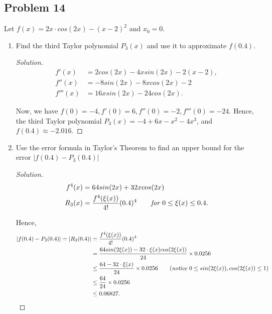 \documentclass{article}
\begin{document}
\subsection*{Problem 14}
Let $f(x) = 2x\cdot cos(2x) - (x-2)^2$ and $x_0 = 0$.
\begin{enumerate}[label=(\alph*)]
    \item Find the third Taylor polynomial $P_3(x)$ and use it to approximate $f(0.4)$.
    \begin{proof}[Solution]
        \begin{align*}
            f'(x) & = 2cos(2x) - 4xsin(2x) - 2(x-2), \\
            f''(x) & = -8sin(2x) - 8xcos(2x) - 2 \\
            f'''(x) & = 16xsin(2x) - 24cos(2x).
        \end{align*}

        Now, we have $f(0) = -4, f'(0) = 6, f''(0) = -2, f'''(0) = -24$. Hence, the third Taylor 
        polynomial $P_3(x) = -4 + 6x -x^2 -4x^3$, and $f(0.4) \approx -2.016$.
    \end{proof}

    \item Use the error formula in Taylor's Theorem to find an upper bound for the error 
    $|f(0.4) - P_3(0.4)|$

    \begin{proof}[Solution]
        \begin{align*}
            f^4(x) & = 64sin(2x) + 32xcos(2x) \\
            R_3(x) & = \frac{f^4(\xi(x))}{4!}(0.4)^4 \qquad \emph{for } 0 \le \xi(x) \le 0.4.
        \end{align*}

        Hence, \begin{align*}
            |f(0.4) - P_3(0.4)| = |R_3(0.4)| & = \frac{f^4(\xi(x))}{4!}(0.4)^4 \\
            & = \frac{64sin(2\xi(x))-32\cdot \xi(x)cos(2\xi(x))}{24}\times 0.0256 \\
            & \le \frac{64-32\cdot \xi(x)}{24}\times 0.0256 \qquad (\emph{notice } 0 \le sin(2\xi(x)),
            cos(2\xi(x))\le 1)\\
            & \le \frac{64}{24}\times 0.0256 \\
            & \le 0.06827.
        \end{align*}
    \end{proof}
\end{enumerate}
\end{document}
